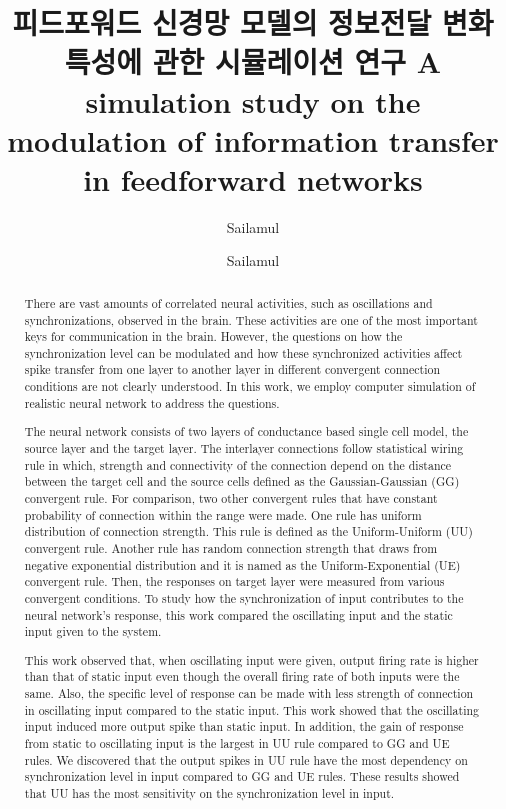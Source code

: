 \documentclass[master,english,final]{kaist-ucs}
\title[korean] {피드포워드 신경망 모델의 정보전달 변화 특성에 관한 시뮬레이션 연구}
\title[english]{ A simulation study on the modulation of \linebreak 
information transfer in feedforward networks}
\author[korean] {}{}
\author[chinese]{Sailamul}{Pachaya}
\author[english]{Sailamul}{Pachaya}
\begin{document}

    \begin{abstract}
   
There are vast amounts of correlated neural activities, such as oscillations and synchronizations, observed in the brain. These activities are one of the most important keys for communication in the brain. However, the questions on how the synchronization level can be modulated and how these synchronized activities affect spike transfer from one layer to another layer in different convergent connection conditions are not clearly understood. In this work, we employ computer simulation of realistic neural network to address the questions. 

The neural network consists of two layers of conductance based single cell model, the source layer and the target layer. The interlayer connections follow statistical wiring rule in which, strength and connectivity of the connection depend on the distance between the target cell and the source cells defined as the Gaussian-Gaussian (GG) convergent rule. For comparison, two other convergent rules that have constant probability of connection within the range were made. One rule has uniform distribution of connection strength. This rule is defined as the Uniform-Uniform (UU) convergent rule. Another rule has random connection strength that draws from negative exponential distribution and it is named as the Uniform-Exponential (UE) convergent rule. Then, the responses on target layer were measured from various convergent conditions. To study how the synchronization of input contributes to the neural network's response, this work compared the oscillating input and the static input given to the system.

This work observed that, when oscillating input were given, output firing rate is higher than that of static input even though the overall firing rate of both inputs were the same. Also, the specific level of response can be made with less strength of connection in oscillating input compared to the static input. This work showed that the oscillating input induced more output spike than static input. In addition, the gain of response from static to oscillating input is the largest in UU rule compared to GG and UE rules. We discovered that the output spikes in UU rule have the most dependency on synchronization level in input compared to GG and UE rules. These results showed that UU has the most sensitivity on the synchronization level in input.
 

\end{abstract}
\end{document}
